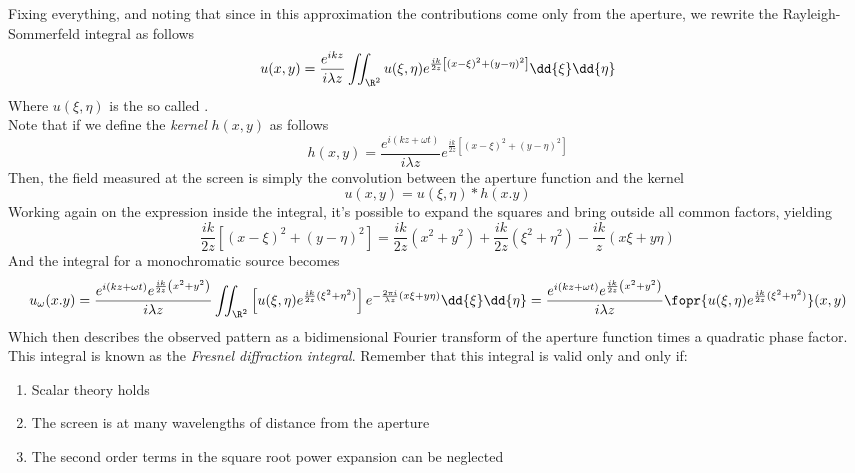 \documentclass[../electromagnetism.tex]{subfiles}
\begin{document}
Fixing everything, and noting that since in this approximation the contributions come only from the aperture, we rewrite the Rayleigh-Sommerfeld integral as follows
\begin{equation}
	u(x,y)=\frac{e^{ikz}}{i\lambda z}\iint_{\R^2}u(\xi,\eta)e^{\frac{ik}{2z}\left[ (x-\xi)^2+(y-\eta)^2 \right]}\dd{\xi}\dd{\eta}
\end{equation}
Where $u(\xi,\eta)$ is the so called .\\
Note that if we define the \textit{kernel} $h(x,y)$ as follows
\begin{equation}
	h(x,y)=\frac{e^{i\left( kz+\omega t \right)}}{i\lambda z}e^{\frac{ik}{2z}\left[ (x-\xi)^2+(y-\eta)^2 \right]}
	\label{eq:kernel.fresnel}
\end{equation}
Then, the field measured at the screen is simply the convolution between the aperture function and the kernel
\begin{equation}
	u(x,y)=u(\xi,\eta)\ast h(x.y)
	\label{eq:convolutionfn.fresnel}
\end{equation}
Working again on the expression inside the integral, it's possible to expand the squares and bring outside all common factors, yielding
\begin{equation*}
	\frac{ik}{2z}\left[ (x-\xi)^2+(y-\eta)^2 \right]=\frac{ik}{2z}(x^2+y^2)+\frac{ik}{2z}(\xi^2+\eta^2)-\frac{ik}{z}\left( x\xi+y\eta \right)
\end{equation*}
And the integral for a monochromatic source becomes
\begin{equation}
	u_\omega(x.y)=\frac{e^{i(kz+\omega t)}e^{\frac{ik}{2z}\left( x^2+y^2 \right)}}{i\lambda z}\iint_{\R^2}\left[ u(\xi,\eta)e^{\frac{ik}{2z}(\xi^2+\eta^2)} \right]e^{-\frac{2\pi i}{\lambda z}(x\xi+y\eta)}\dd{\xi}\dd{\eta}=\frac{e^{i(kz+\omega t)}e^{\frac{ik}{2z}\left( x^2+y^2 \right)}}{i\lambda z}\fopr{u(\xi,\eta)e^{\frac{ik}{2z}(\xi^2+\eta^2)}}(x,y)
	\label{eq:fouriertrans.fresnel}
\end{equation}
Which then describes the observed pattern as a bidimensional Fourier transform of the aperture function times a quadratic phase factor.\\
This integral is known as the \textit{Fresnel diffraction integral}. Remember that this integral is valid only and only if:
\begin{enumerate}
\item Scalar theory holds
\item The screen is at many wavelengths of distance from the aperture
\item The second order terms in the square root power expansion can be neglected
\end{enumerate}
\end{document}
